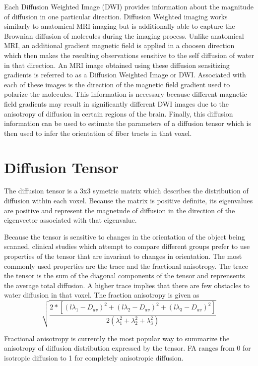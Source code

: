 Each Diffusion Weighted Image (DWI) provides information about the magnitude of diffusion in one particular direction.  Diffusion Weighted imaging works similarly to anatomical MRI imaging but is additionally able to capture the Brownian diffusion of molecules during the imaging process.  Unlike anatomical MRI, an additional gradient magnetic field is applied in a choosen direction which then makes the resulting observations sensitive to the self diffusion of water in that direction. An MRI image obtained using these diffusion sensitizing gradients is referred to as a Diffusion Weighted Image or DWI.  Associated with each of these images is the direction of the magnetic field gradient used to polarize the molecules.  This information is necessary because different magnetic field gradients may result in significantly different DWI images due to the anisotropy of diffusion in certain regions of the brain.  Finally, this diffusion information can be used to estimate the parameters of a diffusion tensor which is then used to infer the orientation of fiber tracts in that voxel.

\section{Diffusion Tensor}
The diffusion tensor is a 3x3 symetric matrix which describes the distribution of diffusion within each voxel.  Because the matrix is positive definite, its eigenvalues are positive and represent the magnetude of diffusion in the direction of the eigenvector associated with that eigenvalue.

Because the tensor is sensitive to changes in the orientation of the object being scanned, clinical studies which attempt to compare different groups prefer to use properties of the tensor that are invariant to changes in orientation.  The most commonly used properties are the trace and the fractional anisotropy.  The trace the tensor is the sum of the diagonal components of the tensor and reprensents the average total diffusion.  A higher trace implies that there are few obstacles to water diffusion in that voxel.  The fraction anisotropy is given as
\begin{equation} \label{eq:tensormodel}
\sqrt{\frac{2*[(l\lambda_1-D_{av})^2 + (l\lambda_2-D_{av})^2 + (l\lambda_3-D_{av})^2]}
{2(\lambda_1^2+\lambda_2^2+\lambda_3^2)}}
\end{equation}

Fractional anisotropy is currently the most popular way to summarize the anisotropy of diffusion distribution expressed by the tensor.  FA ranges from 0 for isotropic diffusion to 1 for completely anisotropic diffusion.

